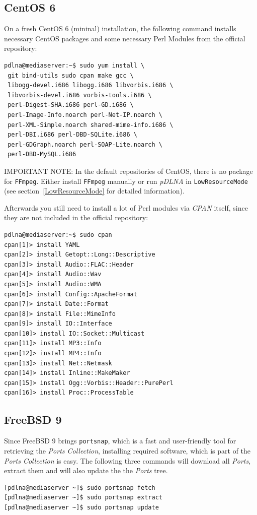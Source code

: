 \documentclass[a4paper,oneside,10pt]{report}
\newenvironment{colframeimportantnote}{%
  \begin{Sbox}
    \begin{minipage}{.99\columnwidth}
}{%
  \end{minipage}
  \end{Sbox}
  \begin{center}
    \fcolorbox{black}{Orange}{\TheSbox}
  \end{center}
}
\begin{document}
\subsection{CentOS 6}

On a fresh CentOS 6 (mininal) installation, the following command installs necessary CentOS packages and some necessary Perl Modules from the official repository:
\begin{lstlisting}
pdlna@mediaserver:~$ sudo yum install \
 git bind-utils sudo cpan make gcc \
 libogg-devel.i686 libogg.i686 libvorbis.i686 \
 libvorbis-devel.i686 vorbis-tools.i686 \
 perl-Digest-SHA.i686 perl-GD.i686 \
 perl-Image-Info.noarch perl-Net-IP.noarch \
 perl-XML-Simple.noarch shared-mime-info.i686 \
 perl-DBI.i686 perl-DBD-SQLite.i686 \
 perl-GDGraph.noarch perl-SOAP-Lite.noarch \
 perl-DBD-MySQL.i686
\end{lstlisting}

\begin{colframeimportantnote}
\textsc{IMPORTANT NOTE:} In the default repositories of CentOS, there is no package for \verb|FFmpeg|. Either install \verb|FFmpeg| manually or run {\em pDLNA} in \verb|LowResourceMode| (see section~\ref{LowResourceMode} for detailed information).
\end{colframeimportantnote}

Afterwards you still need to install a lot of Perl modules via {\em CPAN} itself, since they are not included in the official repository:
\begin{lstlisting}
pdlna@mediaserver:~$ sudo cpan
cpan[1]> install YAML
cpan[2]> install Getopt::Long::Descriptive
cpan[3]> install Audio::FLAC::Header
cpan[4]> install Audio::Wav
cpan[5]> install Audio::WMA
cpan[6]> install Config::ApacheFormat
cpan[7]> install Date::Format
cpan[8]> install File::MimeInfo
cpan[9]> install IO::Interface
cpan[10]> install IO::Socket::Multicast
cpan[11]> install MP3::Info
cpan[12]> install MP4::Info
cpan[13]> install Net::Netmask
cpan[14]> install Inline::MakeMaker
cpan[15]> install Ogg::Vorbis::Header::PurePerl
cpan[16]> install Proc::ProcessTable
\end{lstlisting}

\subsection{FreeBSD 9}

Since FreeBSD 9 brings \verb|portsnap|, which is a fast and user-friendly tool for retrieving the {\em Ports Collection}, installing required software, which is part of the {\em Ports Collection} is easy. The following three commands will download all {\em Ports}, extract them and will also update the the {\em Ports} tree.
\begin{lstlisting}
[pdlna@mediaserver ~]$ sudo portsnap fetch
[pdlna@mediaserver ~]$ sudo portsnap extract
[pdlna@mediaserver ~]$ sudo portsnap update
\end{lstlisting}
\end{document}

